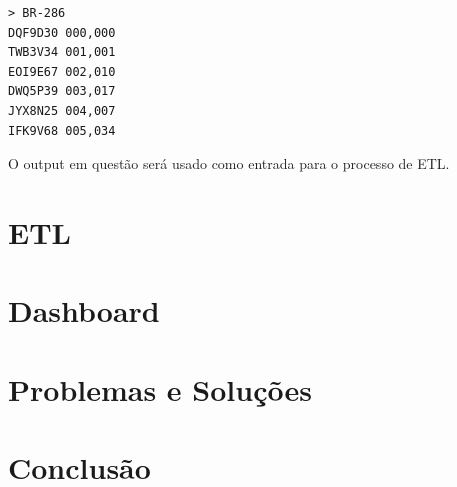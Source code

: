\documentclass{article}
\begin{document}
    \begin{verbatim}
> BR-286
DQF9D30 000,000
TWB3V34 001,001
EOI9E67 002,010
DWQ5P39 003,017
JYX8N25 004,007
IFK9V68 005,034
    \end{verbatim}

    O output em questão será usado como entrada para o processo de ETL.

    \section{ETL}

    \section{Dashboard}

    \section{Problemas e Soluções}

    \section{Conclusão}
\end{document}
